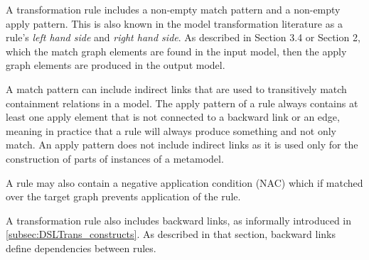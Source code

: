 A transformation rule includes a non-empty match pattern and a non-empty apply pattern. This is also known in the model transformation literature as a rule's \emph{left hand side} and \emph{right hand side}. As described in Section 3.4 or Section 2, which the match graph elements are found in the input model, then the apply graph elements are produced in the output model.

A match pattern can include indirect links that are used to transitively match containment relations in a model. The apply pattern of a rule always contains at least one apply element that is not connected to a backward link or an edge, meaning in practice that a rule will always produce something and not only match. An apply pattern does not include indirect links as it is used only for the construction of parts of instances of a metamodel.

A rule may also contain a negative application condition (NAC) which if matched over the target graph prevents application of the rule.

A transformation rule also includes backward links, as informally introduced in \cref{subsec:DSLTrans_constructs}. As described in that section, backward links define dependencies between rules. 



